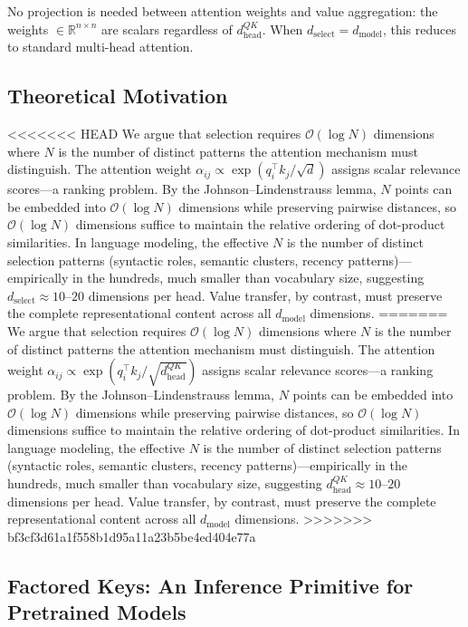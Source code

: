 \documentclass[11pt]{article}
\newcommand{\dmodel}{d_{\text{model}}}
\newcommand{\dselect}{d_{\text{select}}}
\newcommand{\BigO}{\mathcal{O}}
\begin{document}
No projection is needed between attention weights and value aggregation: the weights $\in \mathbb{R}^{n \times n}$ are scalars regardless of $d_{\text{head}}^{QK}$. When $\dselect = \dmodel$, this reduces to standard multi-head attention.

\subsection{Theoretical Motivation}\label{sec:theory}

<<<<<<< HEAD
We argue that selection requires $\BigO(\log N)$ dimensions where $N$ is the number of distinct patterns the attention mechanism must distinguish. The attention weight $\alpha_{ij} \propto \exp(q_i^\top k_j / \sqrt{d})$ assigns scalar relevance scores---a ranking problem. By the Johnson--Lindenstrauss lemma, $N$ points can be embedded into $\BigO(\log N)$ dimensions while preserving pairwise distances, so $\BigO(\log N)$ dimensions suffice to maintain the relative ordering of dot-product similarities. In language modeling, the effective $N$ is the number of distinct selection patterns (syntactic roles, semantic clusters, recency patterns)---empirically in the hundreds, much smaller than vocabulary size, suggesting $\dselect \approx 10$--$20$ dimensions per head. Value transfer, by contrast, must preserve the complete representational content across all $\dmodel$ dimensions.
=======
We argue that selection requires $\BigO(\log N)$ dimensions where $N$ is the number of distinct patterns the attention mechanism must distinguish. The attention weight $\alpha_{ij} \propto \exp(q_i^\top k_j / \sqrt{d_{\text{head}}^{QK}})$ assigns scalar relevance scores---a ranking problem. By the Johnson--Lindenstrauss lemma, $N$ points can be embedded into $\BigO(\log N)$ dimensions while preserving pairwise distances, so $\BigO(\log N)$ dimensions suffice to maintain the relative ordering of dot-product similarities. In language modeling, the effective $N$ is the number of distinct selection patterns (syntactic roles, semantic clusters, recency patterns)---empirically in the hundreds, much smaller than vocabulary size, suggesting $d_{\text{head}}^{QK} \approx 10$--$20$ dimensions per head. Value transfer, by contrast, must preserve the complete representational content across all $\dmodel$ dimensions.
>>>>>>> bf3cf3d61a1f558b1d95a11a23b5be4ed404e77a


\subsection{Factored Keys: An Inference Primitive for Pretrained Models}
\end{document}
